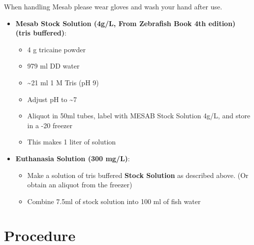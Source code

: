\documentclass[
  letterpaper,
  DIV=11,
  numbers=noendperiod]{scrreprt}
\providecommand{\tightlist}{%
  \setlength{\itemsep}{0pt}\setlength{\parskip}{0pt}}\usepackage{longtable,booktabs,array}
\begin{document}
\begin{tcolorbox}[enhanced jigsaw, bottomtitle=1mm, rightrule=.15mm, toptitle=1mm, opacitybacktitle=0.6, bottomrule=.15mm, titlerule=0mm, coltitle=black, leftrule=.75mm, arc=.35mm, colback=white, colframe=quarto-callout-caution-color-frame, left=2mm, colbacktitle=quarto-callout-caution-color!10!white, title=\textcolor{quarto-callout-caution-color}{\faFire}\hspace{0.5em}{This is a callout CAUTON}, toprule=.15mm, opacityback=0, breakable]

When handling Mesab please wear gloves and wash your hand after use.

\end{tcolorbox}

\begin{itemize}
\item
  \textbf{Mesab Stock Solution (4g/L, From Zebrafish Book 4th edition)
  (tris buffered)}:

  \begin{itemize}
  \tightlist
  \item
    4 g tricaine powder
  \item
    979 ml DD water
  \item
    \textasciitilde21 ml 1 M Tris (pH 9)
  \item
    Adjust pH to \textasciitilde7
  \item
    Aliquot in 50ml tubes, label with MESAB Stock Solution 4g/L, and
    store in a -20 freezer
  \item
    This makes 1 liter of solution
  \end{itemize}
\item
  \textbf{Euthanasia Solution (300 mg/L)}:

  \begin{itemize}
  \tightlist
  \item
    Make a solution of tris buffered \textbf{Stock Solution} as
    described above. (Or obtain an aliquot from the freezer)
  \item
    Combine 7.5ml of stock solution into 100 ml of fish water
  \end{itemize}
\end{itemize}

\hypertarget{procedure-19}{%
\section{Procedure}\label{procedure-19}}
\end{document}
